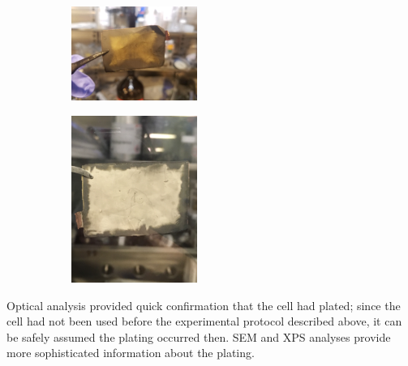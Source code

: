\begin{figure}[t!]\label{fig:optical}
\centering
\caption{Cells cut open after experiencing 5C and zero (left) or one (center) 10C cycles. The dark regions are the graphite electrode, and the light regions lithiation.}
     \begin{subfigure}
         \centering
         \includegraphics[width=0.45\textwidth]{optical5c.JPG}
     \end{subfigure}
     \hfill
     \begin{subfigure}
         \centering
         \includegraphics[width=0.45\textwidth]{optical.JPG}
     \end{subfigure}
\end{figure}

Optical analysis provided quick confirmation that the cell had plated; since the cell had not been used before the experimental protocol described above, it can be safely assumed the plating occurred then. SEM and XPS analyses provide more sophisticated information about the plating. 

